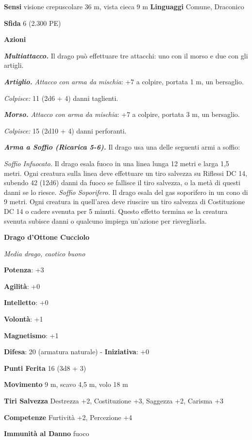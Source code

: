 \begin{multicols}{2}
\textbf{Sensi} visione crepuscolare 36 m, vista cieca 9 m
\textbf{Linguaggi} Comune, Draconico

\textbf{Sfida} 6 (2.300 PE)\smallskip

\smallskip\textbf{Azioni}

\emph{\textbf{Multiattacco.}} Il drago può effettuare tre attacchi: uno
con il morso e due con gli artigli.

\emph{\textbf{Artiglio.} Attacco con arma da mischia}: +7 a colpire,
portata 1 m, un bersaglio.

\emph{Colpisce:} 11 (2d6 + 4) danni taglienti.

\emph{\textbf{Morso.} Attacco con arma da mischia}: +7 a colpire,
portata 3 m, un bersaglio.

\emph{Colpisce:} 15 (2d10 + 4) danni perforanti.

\emph{\textbf{Arma a Soffio (Ricarica 5-6).}} Il drago usa una delle
seguenti armi a soffio:

\emph{Soffio Infuocato.} Il drago esala fuoco in una linea lunga 12
metri e larga 1,5 metri. Ogni creatura sulla linea deve effettuare un
tiro salvezza su Riflessi DC 14, subendo 42 (12d6) danni da fuoco se
fallisce il tiro salvezza, o la metà di questi danni se lo riesce.
\emph{Soffio Soporifero.} Il drago esala del gas soporifero in un cono
di 9 metri. Ogni creatura in quell'area deve riuscire un tiro salvezza
di Costituzione DC 14 o cadere svenuta per 5 minuti. Questo effetto
termina se la creatura svenuta subisce danni o qualcuno impiega
un'azione per risvegliarla.

\textbf{Drago d'Ottone Cucciolo}

\emph{Media drago, caotico buono}

\textbf{Potenza}: +3

\textbf{Agilità}: +0

\textbf{Intelletto}: +0

\textbf{Volontà}: +1

\textbf{Magnetismo}: +1

\textbf{Difesa}: 20 (armatura naturale) - \textbf{Iniziativa}: +0

\textbf{Punti Ferita} 16 (3d8 + 3)

\textbf{Movimento} 9 m, scavo 4,5 m, volo 18 m

\textbf{Tiri Salvezza} Destrezza +2, Costituzione +3, Saggezza +2,
Carisma +3

\textbf{Competenze} Furtività +2, Percezione +4

\textbf{Immunità al Danno} fuoco


\end{multicols}
